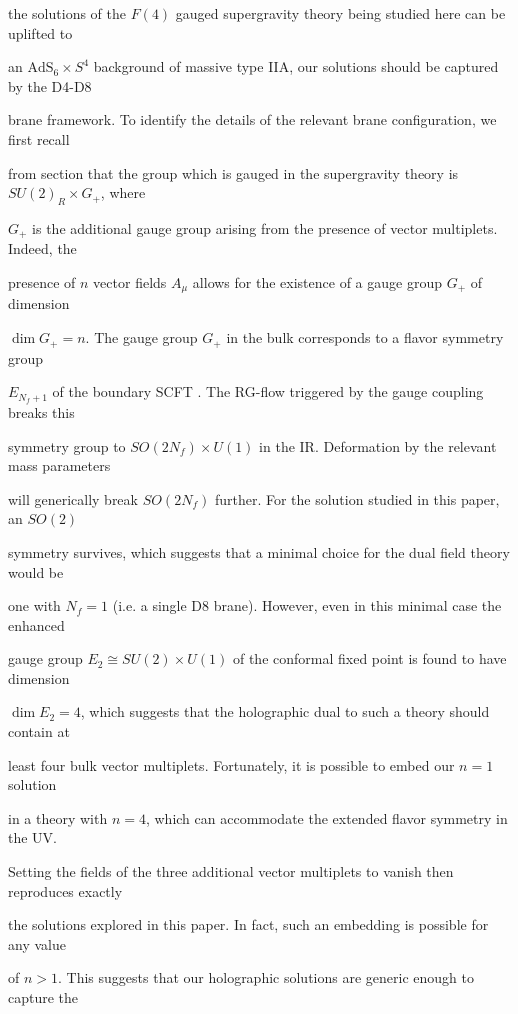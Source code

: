 \documentclass[a4paper,12pt]{article}
\begin{document}
the solutions of the $F(4)$ gauged supergravity theory being studied here can be uplifted to

an $\mathrm{A}\mathrm{d}\mathrm{S}_{6}\times S^{4}$ background of massive type IIA, our solutions should be captured by the D4-D8

brane framework. To identify the details of the relevant brane configuration, we first recall

from section that the group which is gauged in the supergravity theory is $SU(2)_{R}\times G_{+}$, where

$G_{+}$ is the additional gauge group arising from the presence of vector multiplets. Indeed, the

presence of $n$ vector fields $A_{\mu}$ allows for the existence of a gauge group $G_{+}$ of dimension

$\dim G_{+} = n$. The gauge group $G_{+}$ in the bulk corresponds to a flavor symmetry group

$E_{N_{f}+1}$ of the boundary SCFT . The RG-flow triggered by the gauge coupling breaks this

symmetry group to $SO(2N_{f})\times U(1)$ in the IR. Deformation by the relevant mass parameters

will generically break $SO(2N_{f})$ further. For the solution studied in this paper, an $SO(2)$

symmetry survives, which suggests that a minimal choice for the dual field theory would be

one with $N_{f}=1$ (i.e. a single D8 brane). However, even in this minimal case the enhanced

gauge group $E_{2} \cong SU(2) \times U(1)$ of the conformal fixed point is found to have dimension

$\dim E_{2} = 4$, which suggests that the holographic dual to such a theory should contain at

least four bulk vector multiplets. Fortunately, it is possible to embed our $n = 1$ solution

in a theory with $n=4$, which can accommodate the extended flavor symmetry in the UV.

Setting the fields of the three additional vector multiplets to vanish then reproduces exactly

the solutions explored in this paper. In fact, such an embedding is possible for any value

of $n > 1$. This suggests that our holographic solutions are generic enough to capture the
\end{document}
